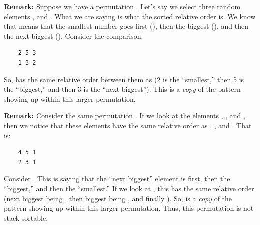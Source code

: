 \documentclass[letterpaper]{article}
\begin{document}
\bigskip 

\textbf{Remark:} Suppose we have a permutation . Let's say we select three random elements ,  and . What we are saying is what the sorted relative order is. We know that  means that the smallest number goes first (), then the biggest (), and then the next biggest (). Consider the comparison:
\begin{verbatim}
    2 5 3
    1 3 2
\end{verbatim}
So,  has the same relative order between them as  (2 is the ``smallest,'' then 5 is the ``biggest,'' and then 3 is the ``next biggest''). This  is a \emph{copy} of the pattern  showing up within this larger permutation.

\bigskip 

\textbf{Remark:} Consider the same permutation . If we look at the elements , , and , then we notice that these elements have the same relative order as , , and . That is:
\begin{verbatim}
    4 5 1
    2 3 1
\end{verbatim}
Consider . This is saying that the ``next biggest'' element is first, then the ``biggest,'' and then the ``smallest.'' If we look at , this has the same relative order (next biggest being , then biggest being , and finally ). So,  is a \emph{copy} of the pattern  showing up within this larger permutation. Thus, this permutation is not stack-sortable. 
\end{document}
